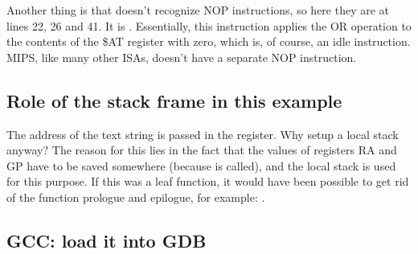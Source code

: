 
Another thing is that \IDA doesn't recognize \ac{NOP} instructions, so here they are at lines 22, 26 and 41.
It is .
Essentially, this instruction applies the OR operation to the contents of the \$AT register
with zero, which is, of course, an idle instruction.
MIPS, like many other \ac{ISA}s, doesn't have a separate \ac{NOP} instruction.

\subsection{Role of the stack frame in this example}

The address of the text string is passed in the register.
Why setup a local stack anyway?
The reason for this lies in the fact that the values of registers \ac{RA} and GP have to be saved somewhere 
(because \printf is called), and the local stack is used for this purpose.
If this was a \gls{leaf function}, it would have been possible to get rid of the function prologue and epilogue,
for example: .

\subsection{\Optimizing GCC: load it into GDB}



